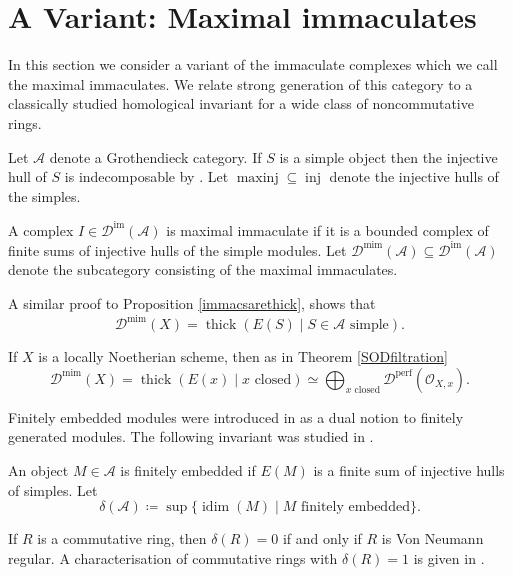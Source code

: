 \documentclass[12pt,oneside]{amsart}
\DeclareMathOperator{\thick}{thick}
\DeclareMathOperator{\perf}{perf}
\DeclareMathOperator{\idim}{idim}
\DeclareMathOperator{\inj}{inj}
\DeclareMathOperator{\minj}{maxinj}
\DeclareMathOperator{\immac}{im}
\DeclareMathOperator{\mimmac}{mim}
\begin{document}
\section{A Variant: Maximal immaculates}
\label{mimmacsec}


In this section we consider a variant of the immaculate complexes which we call the maximal immaculates. We relate strong generation of this category to a classically studied homological invariant for a wide class of noncommutative rings. 


Let $\mathcal{A}$ denote a Grothendieck category. If $S$ is a simple object then the injective hull of $S$ is indecomposable by \cite[Corollary 1]{Gab58}. Let $\minj \subseteq \inj$ denote the injective hulls of the simples. 

\begin{defn}
A complex $I \in \mathcal{D}^{\immac}(\mathcal{A})$ is maximal immaculate if it is a bounded complex of finite sums of injective hulls of the simple modules. 
Let $\mathcal{D}^{\mimmac}(\mathcal{A}) \subseteq \mathcal{D}^{\immac}(\mathcal{A})$ denote the subcategory consisting of the maximal immaculates. 
\end{defn}

\begin{remark}
A similar proof to Proposition \ref{immacsarethick}, shows that 
\[
\mathcal{D}^{\mimmac}(X) = \thick(E(S) \mid S \in \mathcal{A} \text{ simple}).
\]
\end{remark}


\begin{ex} \label{Dmimscheme}
If $X$ is a locally Noetherian scheme, then as in Theorem \ref{SODfiltration}
\[
\mathcal{D}^{\mimmac}(X) = \thick(E(x)\mid x \text{ closed} ) \simeq \bigoplus_{x \text{ closed}} \mathcal{D}^{\perf}(\widehat{\mathcal{O}}_{X,x}).
\]
\end{ex}

Finitely embedded modules were introduced in \cite{Vam68} as a dual notion to finitely generated modules. The following invariant was studied in \cite{Fac82}.

\begin{defn} \label{deltainvariant}
An object $M \in \mathcal{A}$ is finitely embedded if $E(M)$ is a finite sum of injective hulls of simples. Let 
\[
\delta(\mathcal{A}) \coloneq \sup\{ \idim(M) \mid M \text{ finitely embedded} \}.
\]
\end{defn}

\begin{ex} 
If $R$ is a commutative ring, then $\delta(R) = 0$ if and only if $R$ is Von Neumann regular. A characterisation of commutative rings with $\delta(R) = 1$ is given in \cite{Fac82}. 
\end{ex}
\end{document}
